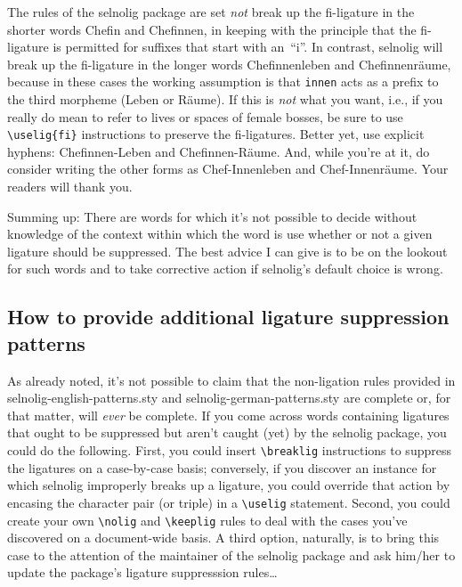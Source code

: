 \documentclass[11pt]{article}
\newcommand{\pkg}[1]{\textsf{#1}}
\newcommand{\opt}[1]{\texttt{#1}}
\newcommand{\cmmd}[1]{\texttt{\textbackslash #1}}
\begin{document}
The rules of the \pkg{selnolig} package are set \emph{not} break up the fi-ligature in the shorter words Chefin and Chefinnen, in keeping with the principle that the fi-ligature is permitted for suffixes that start with an~\enquote{i}. In contrast, \pkg{selnolig} will break up the fi-ligature in the longer words Chefinnenleben and Chefinnenräume, because in these cases the working assumption is that \opt{innen} acts as a prefix to the third morpheme (Leben or Räume). If this is \emph{not} what you want, i.e., if you really do mean to refer to lives or spaces of female bosses, be sure to use \Verb+\uselig{fi}+ instructions to preserve the fi-ligatures. Better yet, use explicit hyphens: Chefinnen-Leben and Chefinnen-Räume. And, while you're at it, do consider writing the other forms as Chef-Innenleben and Chef-Innenräume. Your readers will thank you.

Summing up: There are words for which it's not possible to decide without knowledge of the context within which the word is use whether or not a given ligature should be suppressed. The best advice I can give is to be on the lookout for such words and to take corrective action if \pkg{selnolig}'s default choice is wrong.



\subsection{How to provide additional ligature suppression patterns}

As already noted, it's not possible to claim that the non-ligation rules provided in \pkg{selnolig-english-patterns.sty} and \pkg{selnolig-german-patterns.sty} are complete or, for that matter, will \emph{ever} be complete. If you come across words containing ligatures that ought to be suppressed but aren't caught (yet) by the \pkg{selnolig} package, you could do the following. First, you could insert \cmmd{breaklig} instructions to suppress the ligatures on a case-by-case basis; conversely, if you discover an instance for which \pkg{selnolig} improperly breaks up a ligature, you could override that action by encasing the character pair (or triple) in a \cmmd{uselig} statement. Second, you could create your own \cmmd{nolig} and \cmmd{keeplig} rules to deal with the cases you've discovered on a document-wide basis. A third option, naturally, is to bring this case to the attention of the maintainer of the \pkg{selnolig} package and ask him/her to update the package's ligature suppresssion rules\dots
\end{document}
